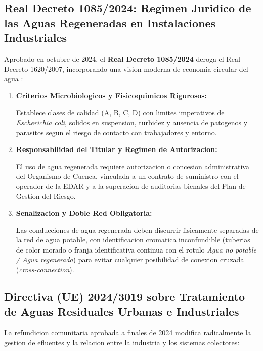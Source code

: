\documentclass{report}
\begin{document}
\subsection{Real Decreto 1085/2024: Regimen Juridico de las Aguas Regeneradas en Instalaciones Industriales}

Aprobado en octubre de 2024, el \textbf{Real Decreto 1085/2024} deroga el Real Decreto 1620/2007, incorporando una vision moderna de economia circular del agua \cite{RD1085_2024}:

\begin{enumerate}

    \item \textbf{Criterios Microbiologicos y Fisicoquimicos Rigurosos:}

    Establece clases de calidad (A, B, C, D) con limites imperativos de \textit{Escherichia coli}, solidos en suspension, turbidez y ausencia de patogenos y parasitos segun el riesgo de contacto con trabajadores y entorno.

    \item \textbf{Responsabilidad del Titular y Regimen de Autorizacion:}

    El uso de agua regenerada requiere autorizacion o concesion administrativa del Organismo de Cuenca, vinculada a un contrato de suministro con el operador de la EDAR y a la superacion de auditorias bienales del Plan de Gestion del Riesgo.

    \item \textbf{Senalizacion y Doble Red Obligatoria:}

    Las conducciones de agua regenerada deben discurrir fisicamente separadas de la red de agua potable, con identificacion cromatica inconfundible (tuberias de color morado o franja identificativa continua con el rotulo \textit{Agua no potable / Agua regenerada}) para evitar cualquier posibilidad de conexion cruzada (\textit{cross-connection}).

\end{enumerate}



\subsection{Directiva (UE) 2024/3019 sobre Tratamiento de Aguas Residuales Urbanas e Industriales}

La refundicion comunitaria aprobada a finales de 2024 \cite{DirectivaUE_2024_3019} modifica radicalmente la gestion de efluentes y la relacion entre la industria y los sistemas colectores:
\end{document}
